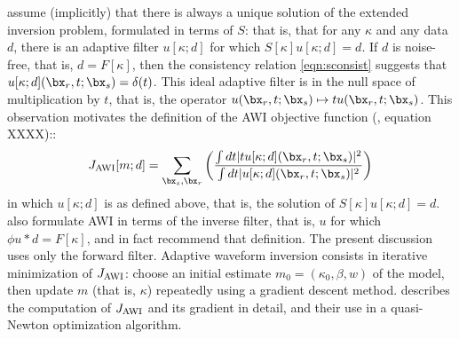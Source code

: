 

\cite{Warner:16} assume (implicitly) that there is always a unique
solution of the extended inversion problem, formulated in terms of
$S$: that is, that
for any $\kappa$ and any data $d$, there is an
adaptive filter $u[\kappa;d]$ for which
$S[\kappa]u[\kappa;d]= d$. If $d$ is noise-free, that is, $d=F[\kappa]$, then the consistency relation \ref{eqn:sconsist}
suggests that $u[\kappa;d](\bx_r,t;\bx_s) = \delta(t)$. This ideal adaptive filter is in the null
space of multiplication by $t$, that is, the operator
$u(\bx_r,t;\bx_s) \mapsto t u(\bx_r,t;\bx_s)$. This
observation motivates the definition of the AWI objective function
(\cite{Warner:16}, equation XXXX)::
\begin{equation}
  \label{eqn:awidef}
  J_{\rm AWI}[m;d] = \sum_{\bx_s,\bx_r} \left(\frac{\int dt |tu[\kappa;d](\bx_r,t;\bx_s)|^2}{\int dt |u[\kappa;d](\bx_r,t;\bx_s)|^2}\right) 
\end{equation}
in which $u[\kappa;d]$ is as defined above, that is, the solution of $S[\kappa]u[\kappa;d]
= d$. \cite{Warner:16} also formulate
AWI in terms of the inverse filter, that is, $u$ for which
$\phi u*d = F[\kappa]$, and in fact recommend that definition. The present
discussion uses only the forward filter.
Adaptive waveform inversion consists in iterative minimization of
$J_{\rm AWI}$: choose an initial estimate $m_0=(\kappa_0,\beta, w)$ of the
model, then update $m$ (that is, $\kappa$) repeatedly using a gradient
descent method. \cite{Warner:16} describes the computation of $J_{\rm AWI}$
and its gradient in detail, and their use in a quasi-Newton
optimization algorithm.

